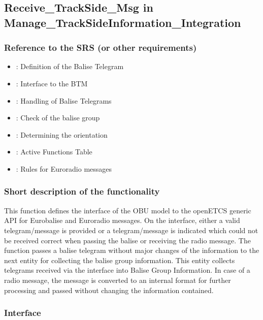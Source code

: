 \subsection{Receive\_TrackSide\_Msg in Manage\_TrackSideInformation\_Integration}

\subsubsection{Reference to the SRS (or other requirements)}
\begin{itemize}
  \item \cite[Chapt.~7 and 8]{subset-026}: Definition of the Balise Telegram
  \item \cite[Chapt.~4.2.2, 4.2.4, 4.2.9]{subset-036}: Interface to the BTM
  \item \cite[Chapt.~3.4.1 - 3.4.3, 3.16.2]{subset-026}: Handling of Balise Telegrams
  \item \cite[Chapt.~3.16.2]{subset-026}: Check of the balise group
  \item \cite[Chapt.~3.4.2]{subset-026}: Determining the orientation
  \item \cite[Chapt.~4.5.2]{subset-026}: Active Functions Table
  \item \cite[Chapt.~8.4.4]{subset-026}: Rules for Euroradio messages
\end{itemize}

\subsubsection{Short description of the functionality}
This function defines the interface of the OBU model to the openETCS generic API for Eurobalise  and Euroradio messages. On the interface, either a valid telegram/message is provided or a telegram/message is indicated which could not be received correct when passing the balise or receiving the radio message. The function passes a balise telegram without major changes of the information to the next entity for collecting the balise group information. This entity collects telegrams received via the interface into Balise Group Information. In case of a radio message, the message is converted to an internal format for further processing and passed without changing the information contained.

\subsubsection{Interface}

